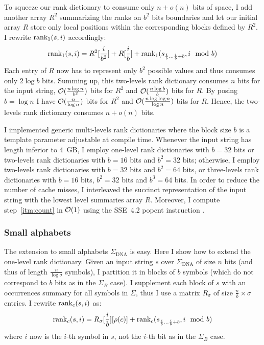 To squeeze our rank dictionary to consume only $n+o(n)$ bits of space, I add another array $R^2$ summarizing the ranks on $b^2$ bits boundaries and let our initial array $R$ store only local positions within the corresponding blocks defined by $R^2$.
I rewrite $\text{rank}_1(s,i)$ accordingly:
\begin{eqnarray}
\text{rank}_1(s,i) = R^2[\frac{i}{b^2}] + R[\frac{i}{b}] + \text{rank}_1(s_{\frac{i}{b} \dots \frac{i}{b}+b}, i \mod{b})
\end{eqnarray}
Each entry of $R$ now has to represent only $b^2$ possible values and thus consumes only $2\log{b}$ bits.
Summing up, this two-levels rank dictionary consumes $n$ bits for the input string, $\mathcal{O}(\frac{n \log{n}}{b^2})$ bits for $R^2$ and $\mathcal{O}(\frac{n \log{b}}{b})$ bits for $R$.
By posing $b=\log{n}$ I have $\mathcal{O}(\frac{n}{\log{n}})$ bits for $R^2$ and $\mathcal{O}(\frac{n \log{\log{n}}}{\log{n}})$ bits for $R$.
Hence, the two-levels rank dictionary consumes $n + o(n)$ bits.

I implemented generic multi-levels rank dictionaries where the block size $b$ is a template parameter adjustable at compile time.
Whenever the input string has length inferior to 4~GB, I employ one-level rank dictionaries with $b = 32$ bits or two-levels rank dictionaries with $b = 16$ bits and $b^2 = 32$ bits;
otherwise, I employ two-levels rank dictionaries with $b = 32$ bits and $b^2 = 64$ bits, or three-levels rank dictionaries with $b = 16$ bits, $b^2 = 32$ bits and $b^3 = 64$ bits.
In order to reduce the number of cache misses, I interleaved the succinct representation of the input string with the lowest level summaries array $R$.
Moreover, I compute step~\ref{itm:count} in $\mathcal{O}(1)$ using the SSE~4.2 popcnt instruction \citep{Intel2011}.

\subsubsection{Small alphabets}

The extension to small alphabets \eg $\Sigma_{\text{DNA}}$ is easy.
Here I show how to extend the one-level rank dictionary.
Given an input string $s$ over $\Sigma_{\text{DNA}}$ of size $n$ bits (and thus of length $\frac{n}{\log{\sigma}}$ symbols), I partition it in blocks of $b$ symbols (which do not correspond to $b$ bits as in the $\Sigma_B$ case).
I supplement each block of $s$ with an occurrences summary for all symbols in $\Sigma$, thus I use a matrix $R_{\sigma}$ of size $\frac{n}{b} \times \sigma$ entries.
I rewrite $\text{rank}_c(s,i)$ as:
\begin{eqnarray}
\text{rank}_c(s,i) = R_{\sigma}[\frac{i}{b}][\rho(c)] + \text{rank}_c(s_{\frac{i}{b} \dots \frac{i}{b}+b}, i \mod{b})
\end{eqnarray}
where $i$ now is the $i$-th symbol in $s$, not the $i$-th bit as in the $\Sigma_B$ case.

